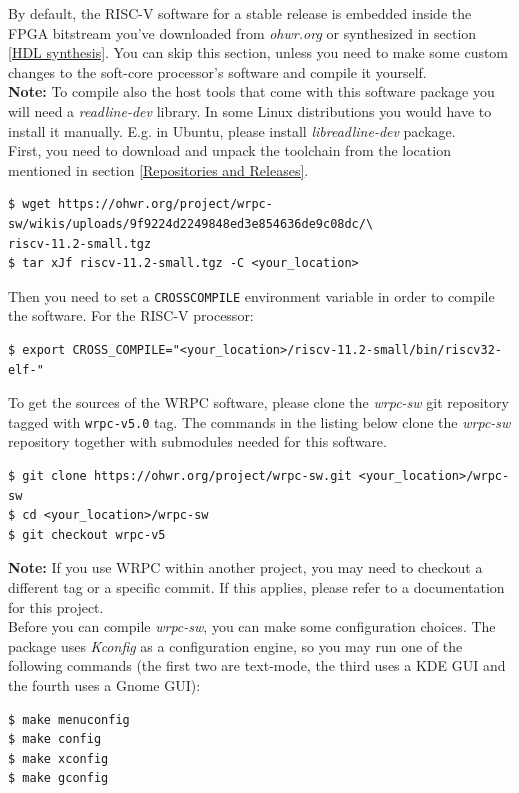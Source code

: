 \documentclass[a4paper, 12pt]{article}
\renewcommand{\_}{\underscore\allowbreak}
\begin{document}
By default, the RISC-V software for a stable release is embedded
inside the FPGA bitstream you've downloaded from \textit{ohwr.org} or
synthesized in section \ref{HDL synthesis}. You can skip this section, unless
you need to make some custom changes to the soft-core processor's software and
compile it yourself.\\

\textbf{Note:} To compile also the host tools that come with this software
package you will need a \emph{readline-dev} library. In some Linux distributions
you would have to install it manually. E.g. in Ubuntu, please install
\emph{libreadline-dev} package.\\

First, you need to download and unpack the toolchain from the location
mentioned in section \ref{Repositories and Releases}.
\begin{lstlisting}
$ wget https://ohwr.org/project/wrpc-sw/wikis/uploads/9f9224d2249848ed3e854636de9c08dc/\
riscv-11.2-small.tgz
$ tar xJf riscv-11.2-small.tgz -C <your_location>
\end{lstlisting}

Then you need to set a \texttt{CROSS\_COMPILE} environment variable in order
to compile the software. For the RISC-V processor:
\begin{lstlisting}
$ export CROSS_COMPILE="<your_location>/riscv-11.2-small/bin/riscv32-elf-"
\end{lstlisting}

To get the sources of the WRPC software, please clone the \textit{wrpc-sw} git
repository tagged with \texttt{wrpc-v5.0} tag. The commands in the listing below
clone the \textit{wrpc-sw} repository together with submodules needed for this software.\\
\begin{lstlisting}
$ git clone https://ohwr.org/project/wrpc-sw.git <your_location>/wrpc-sw
$ cd <your_location>/wrpc-sw
$ git checkout wrpc-v5
\end{lstlisting}

\textbf{Note:} If you use WRPC within another project, you may need to checkout
a different tag or a specific commit. If this applies, please refer to a
documentation for this project.\\

Before you can compile \textit{wrpc-sw}, you can make some configuration
choices. The package uses \textit{Kconfig} as a configuration engine, so you may
run one of the following commands (the first two are text-mode, the third uses
a KDE GUI and the fourth uses a Gnome GUI):
\begin{lstlisting}
$ make menuconfig
$ make config
$ make xconfig
$ make gconfig
\end{lstlisting}
\end{document}
